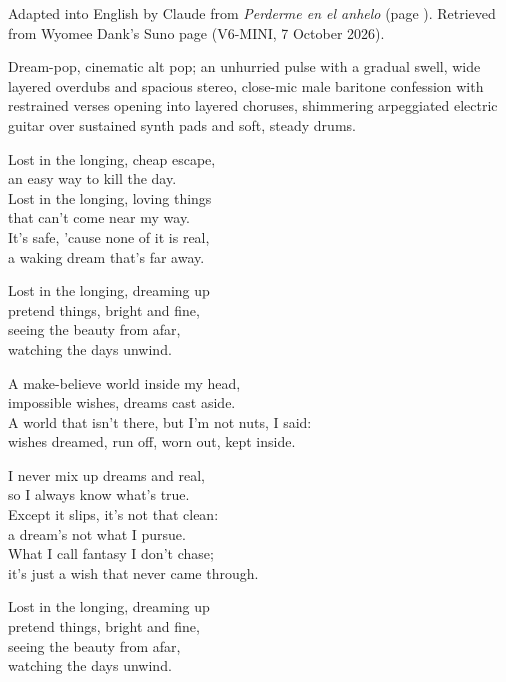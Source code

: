 
\begin{notes}
Adapted into English by Claude from \emph{Perderme en el anhelo} (page \pageref{sec:perderme-en-el-anhelo}). Retrieved from Wyomee Dank's Suno page (V6-MINI, 7 October 2026).
\end{notes}
\begin{style}
Dream-pop, cinematic alt pop; an unhurried pulse with a gradual swell, wide layered overdubs and spacious stereo, close-mic male baritone confession with restrained verses opening into layered choruses, shimmering arpeggiated electric guitar over sustained synth pads and soft, steady drums.
\end{style}
\begin{lyrics}
Lost in the longing, cheap escape,\\
an easy way to kill the day.\\
Lost in the longing, loving things\\
that can't come near my way.\\
It's safe, 'cause none of it is real,\\
a waking dream that's far away.

Lost in the longing, dreaming up\\
pretend things, bright and fine,\\
seeing the beauty from afar,\\
watching the days unwind.

A make-believe world inside my head,\\
impossible wishes, dreams cast aside.\\
A world that isn't there, but I'm not nuts, I said:\\
wishes dreamed, run off, worn out, kept inside.

I never mix up dreams and real,\\
so I always know what's true.\\
Except it slips, it's not that clean:\\
a dream's not what I pursue.\\
What I call fantasy I don't chase;\\
it's just a wish that never came through.

Lost in the longing, dreaming up\\
pretend things, bright and fine,\\
seeing the beauty from afar,\\
watching the days unwind.


\end{lyrics}
